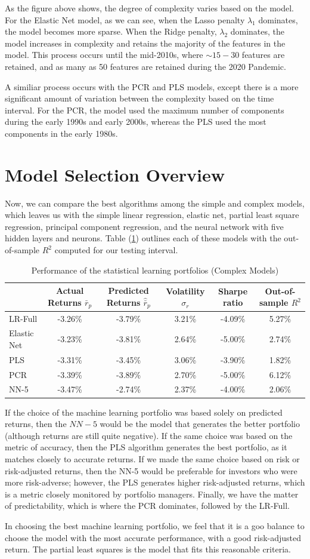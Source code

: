 As the figure above shows, the degree of complexity varies based on the model. For the Elastic Net model, as we can see, when the Lasso penalty $\lambda_1$ dominates, the model becomes more sparse. When the Ridge penalty, $\lambda_2$ dominates, the model increases in complexity and retains the majority of the features in the model. This process occurs until the mid-2010s, where $\sim15-30$ features are retained, and as many as 50 features are retained during the 2020 Pandemic.

A similiar process occurs with the PCR and PLS models, except there is a more significant amount of variation between the complexity based on the time interval. For the PCR, the model used the maximum number of components during the early 1990s and early 2000s, whereas the PLS used the most components in the early 1980s.
\section{Model Selection Overview}
Now, we can compare the best algorithms among the simple and complex models, which leaves us with the simple linear regression, elastic net, partial least square regression, principal component regression, and the neural network with five hidden layers and neurons. Table (\ref{tab:final}) outlines each of these models with the out-of-sample $R^2$ computed for our testing interval.
\begin{table}[ht]
	\centering
	\caption{Performance of the statistical learning portfolios (Complex Models)}
	\begin{tabular}[t]{lccccc}
		\toprule
		&Actual Returns $\bar{r}_{p}$&Predicted Returns $\hat{\bar{r}}_{p}$&Volatility $\sigma_r$ & Sharpe ratio & Out-of-sample $R^2$ \\
		\midrule
		LR-Full&-3.26\%	&-3.79\%&3.21\%&-4.09\%&5.27\% \\	
		Elastic Net &-3.23\%&-3.81\%&2.64\%&-5.00\%&2.74\%\\		
		PLS &-3.31\%&-3.45\%&3.06\%&-3.90\%&1.82\%\\
		PCR &-3.39\%&-3.89\%&2.70\%&-5.00\%&6.12\%\\
		NN-5&-3.47\%&-2.74\%&2.37\%&-4.00\%&2.06\%\\
		\bottomrule
	\end{tabular}\label{tab:final}
\end{table}

If the choice of the machine learning portfolio was based solely on predicted returns, then the $NN-5$ would be the model that generates the better portfolio (although returns are still quite negative). If the same choice was based on the metric of accuracy, then the PLS algorithm generates the best portfolio, as it matches closely to accurate returns. If we made the same choice based on risk or risk-adjusted returns, then the NN-5 would be preferable for investors who were more risk-adverse; however, the PLS generates higher risk-adjusted returns, which is a metric closely monitored by portfolio managers. Finally, we have the matter of predictability, which is where the PCR dominates, followed by the LR-Full.

In choosing the best machine learning portfolio, we feel that it is a goo balance to choose the model with the most accurate performance, with a good risk-adjusted return. The partial least squares is the model that fits this reasonable criteria.

